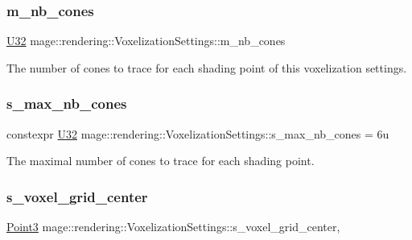 \subsubsection{\texorpdfstring{m\+\_\+nb\+\_\+cones}{m\_nb\_cones}}
{\footnotesize\ttfamily \hyperlink{namespacemage_a41c104c036fba3756a74e19f793eeaa1}{U32} mage\+::rendering\+::\+Voxelization\+Settings\+::m\+\_\+nb\+\_\+cones\hspace{0.3cm}{\ttfamily [private]}}

The number of cones to trace for each shading point of this voxelization settings. \hypertarget{classmage_1_1rendering_1_1_voxelization_settings_a7d5ceb0965e5c3a9aa1e16dd6dd06eed}{}\label{classmage_1_1rendering_1_1_voxelization_settings_a7d5ceb0965e5c3a9aa1e16dd6dd06eed} 
\subsubsection{\texorpdfstring{s\+\_\+max\+\_\+nb\+\_\+cones}{s\_max\_nb\_cones}}
{\footnotesize\ttfamily constexpr \hyperlink{namespacemage_a41c104c036fba3756a74e19f793eeaa1}{U32} mage\+::rendering\+::\+Voxelization\+Settings\+::s\+\_\+max\+\_\+nb\+\_\+cones = 6u\hspace{0.3cm}{\ttfamily [static]}}

The maximal number of cones to trace for each shading point. \hypertarget{classmage_1_1rendering_1_1_voxelization_settings_a37151063ebbf6ae6ea193fb0ce05d270}{}\label{classmage_1_1rendering_1_1_voxelization_settings_a37151063ebbf6ae6ea193fb0ce05d270} 
\subsubsection{\texorpdfstring{s\+\_\+voxel\+\_\+grid\+\_\+center}{s\_voxel\_grid\_center}}
{\footnotesize\ttfamily \hyperlink{structmage_1_1_point3}{Point3} mage\+::rendering\+::\+Voxelization\+Settings\+::s\+\_\+voxel\+\_\+grid\+\_\+center\hspace{0.3cm}{\ttfamily [static]}, {\ttfamily [private]}}

